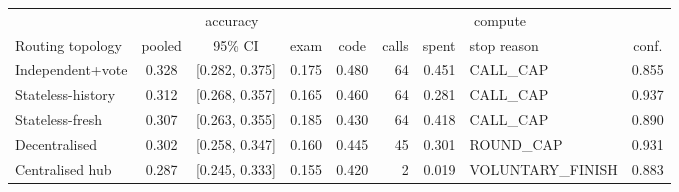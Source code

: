 \begin{tabular}{lccccrrlc}
\toprule
& \multicolumn{3}{c}{accuracy} & & \multicolumn{3}{c}{compute} & \\
\cmidrule(lr){2-4}\cmidrule(lr){6-8}
Routing topology & pooled & 95\% CI & exam & code & calls & spent & stop reason & conf. \\
\midrule
Independent+vote & 0.328 & [0.282, 0.375] & 0.175 & 0.480 & 64 & 0.451 & CALL\_CAP & 0.855 \\
Stateless-history & 0.312 & [0.268, 0.357] & 0.165 & 0.460 & 64 & 0.281 & CALL\_CAP & 0.937 \\
Stateless-fresh & 0.307 & [0.263, 0.355] & 0.185 & 0.430 & 64 & 0.418 & CALL\_CAP & 0.890 \\
Decentralised & 0.302 & [0.258, 0.347] & 0.160 & 0.445 & 45 & 0.301 & ROUND\_CAP & 0.931 \\
Centralised hub & 0.287 & [0.245, 0.333] & 0.155 & 0.420 & 2 & 0.019 & VOLUNTARY\_FINISH & 0.883 \\
\bottomrule
\end{tabular}